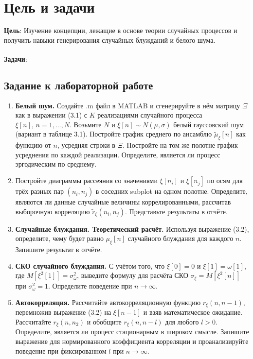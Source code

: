 \chapter{Цель и задачи}
\label{ch:intro}

\textbf{Цель}: Изучение концепции, лежащие в основе теории
случайных процессов и получить навыки генерирования случайных
блужданий и белого шума. \\
\\\textbf{Задачи}:

\section*{Задание к лабораторной работе}

\begin{enumerate}
    \item \textbf{Белый шум.} Создайте .m файл в MATLAB и сгенерируйте в нём матрицу $\Xi$ как в выражении (3.1) с $K$ реализациями случайного процесса $\xi[n],\, n=1,\dots,N$. Возьмите $N$ и $\xi[n] \sim N(\mu, \sigma)$ белый гауссовский шум (вариант в таблице 3.1). Постройте график среднего по ансамблю $\tilde{\mu}_\xi[n]$ как функцию от $n$, усредняя строки в $\Xi$. Постройте на том же полотне график усреднения по каждой реализации. Определите, является ли процесс эргодическим по среднему.
    
    \item Постройте диаграммы рассеяния со значениями $\xi[n_i]$ и $\xi[n_j]$ по осям для трёх разных пар $(n_i,n_j)$ в соседних subplot на одном полотне. Определите, являются ли данные случайные величины коррелированными, рассчитав выборочную корреляцию $\tilde{r}_\xi(n_i,n_j)$. Представьте результаты в отчёте.
    
    \item \textbf{Случайные блуждания. Теоретический расчёт.} Используя выражение (3.2), определите, чему будет равно $\mu_{\xi}[n]$ случайного блуждания для каждого $n$. Запишите результат в отчёте.
    
    \item \textbf{СКО случайного блуждания.} С учётом того, что $\xi[0]=0$ и $\xi[1]=\omega[1]$, где $M[\xi^2[1]] = \sigma_\omega^2$, выведите формулу для расчёта СКО $\sigma_\xi = M[\xi^2[n]]$ при $\sigma_\omega^2 = 1$. Определите поведение при $n \to \infty$.
    
    \item \textbf{Автокорреляция.} Рассчитайте автокорреляционную функцию $r_\xi(n,n-1)$, перемножив выражение (3.2) на $\xi[n-1]$ и взяв математическое ожидание. Рассчитайте $r_\xi(n,n_2)$ и обобщите $r_\xi(n,n-l)$ для любого $l>0$. Определите, является ли процесс стационарным в широком смысле. Запишите выражение для нормированного коэффициента корреляции и проанализируйте поведение при фиксированном $l$ при $n \to \infty$.
    

\end{enumerate}
